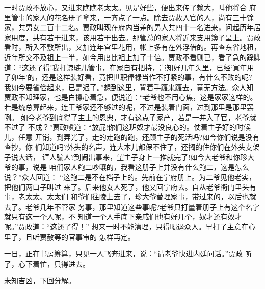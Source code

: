 一时贾政不放心，又进来瞧瞧老太太。见是好些，便出来传了赖大，叫他将合
府里管事的家人的花名册子拿来，一齐点了一点。除去贾赦入官的人，尚有三十馀
家，共男女二百十二名。贾政叫现在府内当差的男人共四十一名进来，问起历年居
家用度，共有若干进来，该用若干出去。那管总的家人将近来支用簿子呈上。贾政
看时，所入不敷所出，又加连年宫里花用，帐上多有在外浮借的。再查东省地租，
近年所交不及祖上一半，如今用度比祖上加了十倍。贾政不看则已，看了急的跺脚
道：“这还了得!我打谅琏儿管事，在家自有把持，岂知好几年头里，已经‘寅年用
了卯年’的，还是这样装好看，竟把世职俸禄当作不打紧的事，有什么不败的呢?
我如今要省俭起来，已是迟了。”想到这里，背着手踱来踱去，竟无方法。众人知
贾政不知理家，也是白操心着急，便说道：“老爷也不用心焦，这是家家这样的。
若是统总算起来，连王爷家还不够过的呢，不过是装着门面，过到那里是那里罢咧。
如今老爷到底得了主上的恩典，才有这点子家产，若是一并入了官，老爷就不过了
不成？”贾政嗔道：“放屁!你们这班奴才最没良心的。仗着主子好的时候儿，任意
开销，到弄光了，走的走跑的跑，还顾主子的死活吗?如今你们说是没有查抄，你
们知道吗?外头的名声，连大本儿都保不住了，还搁的住你们在外头支架子说大话，
诓人骗人?到闹出事来，望主子身上一推就完了!如今大老爷和你珍大爷的事，说是
咱们家人鲍二吵嚷的，我看这册子上并没有什么鲍二，这是怎么说？”众人回道：
“这鲍二是不在档子上的。先前在宁府册上。为二爷见他老实，把他们两口子叫过
来了。后来他女人死了，他又回宁府去。自从老爷衙门里头有事，老太太、太太们
和爷们往陵上去了，珍大爷替理家事，带过来的，以后也就去了。老爷几年不管家
务事，那里知道这些事呢?老爷只打量着册子上有这个名字就只有这一个人呢，不
知道一个人手底下亲戚们也有好几个，奴才还有奴才呢。”贾政道：“这还了得！”
想来一时不能清理，只得喝退众人。早打了主意在心里了，且听贾赦等的官事审的
怎样再定。

一日，正在书房筹算，只见一人飞奔进来，说：“请老爷快进内廷问话。”贾政
听了，心下着忙，只得进去。

未知吉凶，下回分解。